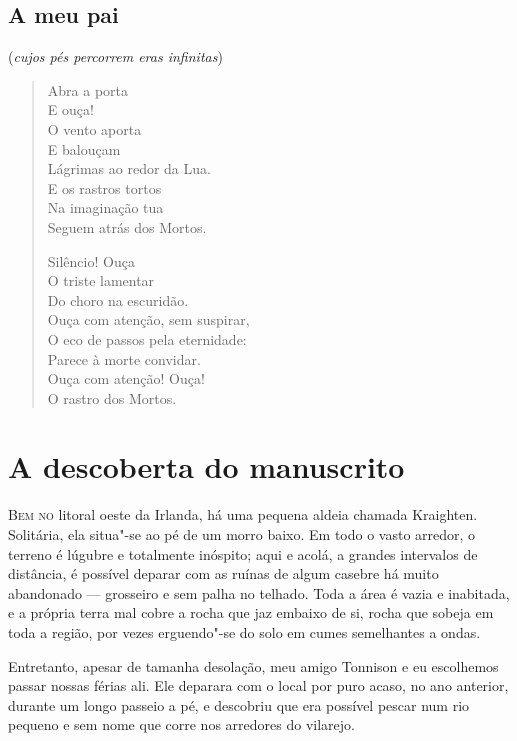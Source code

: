 \section{A meu pai}

\bgroup\centering
(\emph{cujos pés percorrem eras infinitas})
\par\smallskip\egroup

\begin{verse}
Abra a porta\\
E ouça!\\
O vento aporta\\
E balouçam\\
Lágrimas ao redor da Lua.\\
E os rastros tortos\\
Na imaginação tua\\
Seguem atrás dos Mortos.

Silêncio! Ouça\\
O triste lamentar\\
Do choro na escuridão.\\
Ouça com atenção, sem suspirar,\\
O eco de passos pela eternidade:\\
Parece à morte convidar.\\
Ouça com atenção! Ouça!\\
O rastro dos Mortos.
\end{verse}


\cleardoublepage


\chapter{A descoberta do manuscrito}

\textsc{Bem no} litoral oeste da Irlanda, há uma pequena aldeia chamada Kraighten. Solitária, ela situa"-se ao pé de um morro
baixo. Em todo o vasto arredor, o terreno é lúgubre e totalmente inóspito; aqui e acolá, a grandes intervalos de
distância, é possível deparar com as ruínas de algum casebre há muito abandonado --- grosseiro e sem palha no telhado.
Toda a área é vazia e inabitada, e a própria terra mal cobre a rocha que jaz embaixo de si, rocha que sobeja em toda a
região, por vezes erguendo"-se do solo em cumes semelhantes a ondas.

Entretanto, apesar de tamanha desolação, meu amigo Tonnison e eu escolhemos passar nossas férias ali. Ele deparara
com o local por puro acaso, no ano anterior, durante um longo passeio a pé, e descobriu que era possível pescar num rio
pequeno e sem nome que corre nos arredores do vilarejo.

